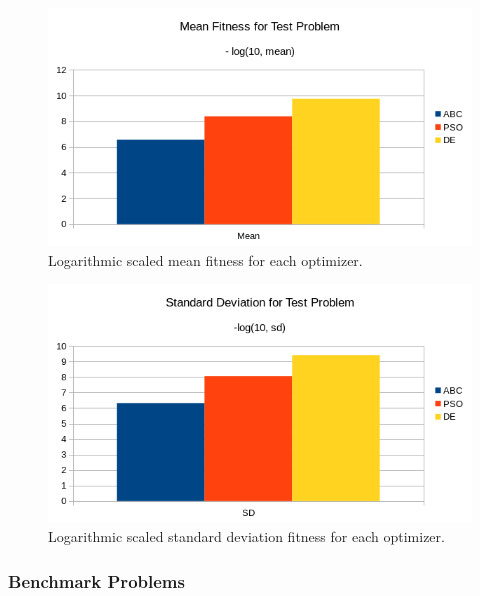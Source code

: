 \begin{figure}
    \centering
    \includegraphics[width=\textwidth,height=\textheight,keepaspectratio]{figures/testproblem_meanfitness.png}
    \caption{Logarithmic scaled mean fitness for each optimizer.}
    \label{fig:testproblemmean}
\end{figure}
\begin{figure}
    \centering
    \includegraphics[width=\textwidth,height=\textheight,keepaspectratio]{figures/testproblem_sdfitness.png}
    \caption{Logarithmic scaled standard deviation fitness for each optimizer.}
    \label{fig:testproblemsd}
\end{figure}

\subsubsection{Benchmark Problems}


